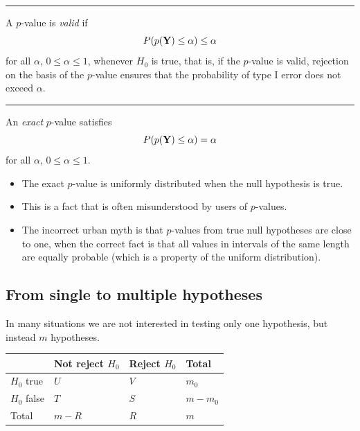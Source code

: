 \documentclass[
  letterpaper,
  DIV=11,
  numbers=noendperiod]{scrartcl}
\providecommand{\tightlist}{%
  \setlength{\itemsep}{0pt}\setlength{\parskip}{0pt}}\usepackage{longtable,booktabs,array}
\begin{document}
\begin{center}\rule{0.5\linewidth}{0.5pt}\end{center}

A \(p\)-value is \emph{valid} if
\[ P(p(\bf{Y}) \leq \alpha) \leq \alpha \] for all \(\alpha\),
\(0 \leq \alpha \leq 1\), whenever \(H_0\) is true, that is, if the
\(p\)-value is valid, rejection on the basis of the \(p\)-value ensures
that the probability of type I error does not exceed \(\alpha\).

\begin{center}\rule{0.5\linewidth}{0.5pt}\end{center}

An \emph{exact} \(p\)-value satisfies
\[P(p(\bf{Y}) \leq \alpha) = \alpha\] for all \(\alpha\),
\(0 \leq \alpha \leq 1\).

\begin{itemize}
\tightlist
\item
  The exact \(p\)-value is uniformly distributed when the null
  hypothesis is true.
\item
  This is a fact that is often misunderstood by users of \(p\)-values.
\item
  The incorrect urban myth is that \(p\)-values from true null
  hypotheses are close to one, when the correct fact is that all values
  in intervals of the same length are equally probable (which is a
  property of the uniform distribution).
\end{itemize}

\hypertarget{from-single-to-multiple-hypotheses}{%
\subsection{From single to multiple
hypotheses}\label{from-single-to-multiple-hypotheses}}

In many situations we are not interested in testing only one hypothesis,
but instead \(m\) hypotheses.

\begin{longtable}[]{@{}llll@{}}
\toprule()
& Not reject \(H_0\) & Reject \(H_0\) & Total \\
\midrule()
\endhead
\(H_0\) true & \(U\) & \(V\) & \(m_0\) \\
\(H_0\) false & \(T\) & \(S\) & \(m - m_0\) \\
Total & \(m-R\) & \(R\) & \(m\) \\
\bottomrule()
\end{longtable}
\end{document}
